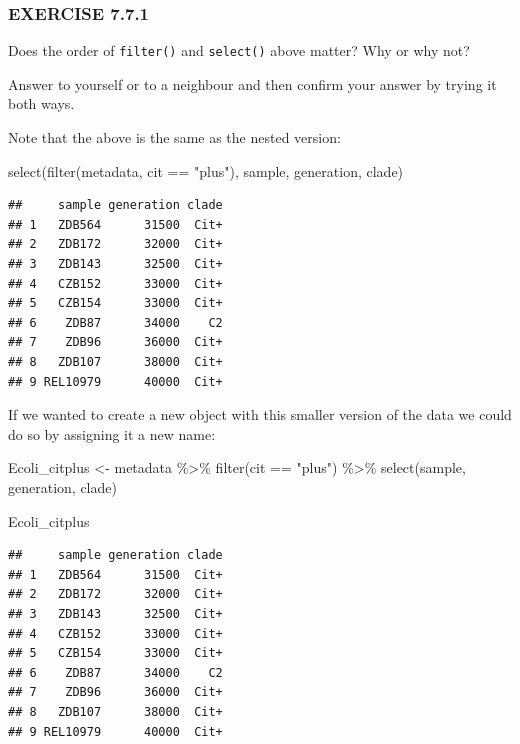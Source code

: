 \documentclass[
]{book}
\newenvironment{Shaded}{\begin{snugshade}}{\end{snugshade}}
\newcommand{\FunctionTok}[1]{\textcolor[rgb]{0.00,0.00,0.00}{#1}}
\newcommand{\NormalTok}[1]{#1}
\newcommand{\OtherTok}[1]{\textcolor[rgb]{0.56,0.35,0.01}{#1}}
\newcommand{\SpecialCharTok}[1]{\textcolor[rgb]{0.00,0.00,0.00}{#1}}
\newcommand{\StringTok}[1]{\textcolor[rgb]{0.31,0.60,0.02}{#1}}
\begin{document}
\hypertarget{exercise-7.7.1}{%
\subsubsection*{EXERCISE 7.7.1}\label{exercise-7.7.1}}

Does the order of \texttt{filter()} and \texttt{select()} above matter? Why or why not?

Answer to yourself or to a neighbour and then confirm your answer by trying it both ways.

Note that the above is the same as the nested version:

\begin{Shaded}
\begin{Highlighting}[]
\FunctionTok{select}\NormalTok{(}\FunctionTok{filter}\NormalTok{(metadata, cit }\SpecialCharTok{==} \StringTok{"plus"}\NormalTok{), sample, generation, clade)}
\end{Highlighting}
\end{Shaded}

\begin{verbatim}
##     sample generation clade
## 1   ZDB564      31500  Cit+
## 2   ZDB172      32000  Cit+
## 3   ZDB143      32500  Cit+
## 4   CZB152      33000  Cit+
## 5   CZB154      33000  Cit+
## 6    ZDB87      34000    C2
## 7    ZDB96      36000  Cit+
## 8   ZDB107      38000  Cit+
## 9 REL10979      40000  Cit+
\end{verbatim}

If we wanted to create a new object with this smaller version of the data we could do so by assigning it a new name:

\begin{Shaded}
\begin{Highlighting}[]
\NormalTok{Ecoli\_citplus }\OtherTok{\textless{}{-}}\NormalTok{ metadata }\SpecialCharTok{\%\textgreater{}\%}
  \FunctionTok{filter}\NormalTok{(cit }\SpecialCharTok{==} \StringTok{"plus"}\NormalTok{) }\SpecialCharTok{\%\textgreater{}\%}
  \FunctionTok{select}\NormalTok{(sample, generation, clade)}

\NormalTok{Ecoli\_citplus}
\end{Highlighting}
\end{Shaded}

\begin{verbatim}
##     sample generation clade
## 1   ZDB564      31500  Cit+
## 2   ZDB172      32000  Cit+
## 3   ZDB143      32500  Cit+
## 4   CZB152      33000  Cit+
## 5   CZB154      33000  Cit+
## 6    ZDB87      34000    C2
## 7    ZDB96      36000  Cit+
## 8   ZDB107      38000  Cit+
## 9 REL10979      40000  Cit+
\end{verbatim}
\end{document}
